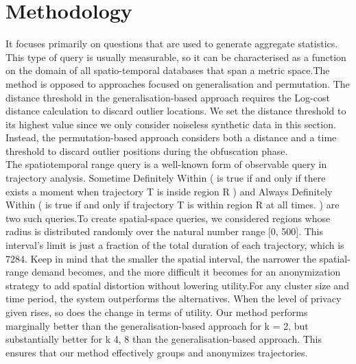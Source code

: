 \section{Methodology}
It focuses primarily on questions that are used to generate aggregate statistics.
This type of query is usually measurable, so it can be characterised as a function on the domain of all spatio-temporal databases that span a metric space.The method is opposed to approaches focused on generalisation and permutation. The distance threshold in the generalisation-based approach requires the Log-cost distance calculation to discard outlier locations. We set the distance threshold to its highest value since we only consider noiseless synthetic data in this section. Instead, the permutation-based approach considers both a distance and a time threshold to discard outlier positions during the obfuscation phase.\\
The spatiotemporal range query is a well-known form of observable query in trajectory analysis. Sometime Definitely Within ( is true if and only if there exists a moment when trajectory T is inside region R ) and Always Definitely Within ( is true if and only if trajectory T is within region R at all times. ) are two such queries.To create spatial-space queries, we considered regions whose radius is distributed randomly over the natural number range [0, 500]. This interval's limit is just a fraction of the total duration of each trajectory, which is 7284. Keep in mind that the smaller the spatial interval, the narrower the spatial-range demand becomes, and the more difficult it becomes for an anonymization strategy to add spatial distortion without lowering utility.For any cluster size and time period, the system outperforms the alternatives. When the level of privacy given rises, so does the change in terms of utility. Our method performs marginally better than the generalisation-based approach for k = 2, but substantially better for k 4, 8 than the generalisation-based approach. This ensures that our method effectively groups and anonymizes trajectories.